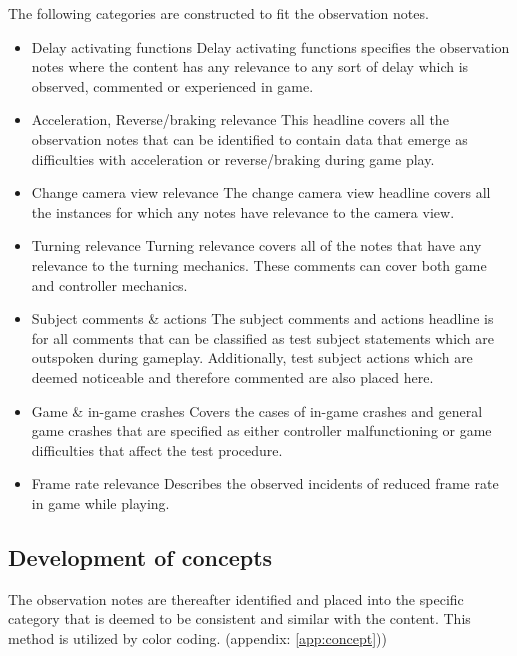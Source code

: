 The following categories are constructed to fit the observation notes.

\begin{itemize}
	\item Delay activating functions\newline
		Delay activating functions specifies the observation notes where the content has any relevance to any sort of delay 			which is observed, commented or experienced in game.
	\item Acceleration, Reverse/braking relevance\newline
		This headline covers all the observation notes that can be identified to contain data that emerge as difficulties 				with acceleration or reverse/braking during game play. 
	\item Change camera view relevance\newline
		The change camera view headline covers all the instances for which any notes have relevance to the camera view.
	\item Turning relevance\newline
		Turning relevance covers all of the notes that have any relevance to the turning mechanics. These comments can cover 			both game and controller mechanics.
	\item Subject comments \& actions\newline
		The subject comments and actions headline is for all comments that can be classified as test subject statements which 		are outspoken during gameplay. Additionally, test subject actions which are deemed noticeable and therefore commented 		are also placed here.
	\item Game \& in-game crashes\newline
		Covers the cases of in-game crashes and general game crashes that are specified as either controller malfunctioning 			or game difficulties that affect the test procedure.
	\item Frame rate relevance\newline
		Describes the observed incidents of reduced frame rate in game while playing.
\end{itemize}


\subsection*{Development of concepts}
The observation notes are thereafter identified and placed into the specific category that is deemed to be consistent and similar with the content. 
This method is utilized by color coding. (appendix: \ref{app:concept}))

